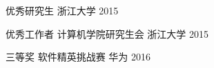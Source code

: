




\begin{cvhonors}


\cvhonor
{优秀研究生} %
{} %
{浙江大学} %
{2015} %


\cvhonor
{优秀工作者} %
{计算机学院研究生会} %
{浙江大学} %
{2015} %


\cvhonor
{三等奖} %
{软件精英挑战赛} %
{华为} %
{2016} %


\end{cvhonors}